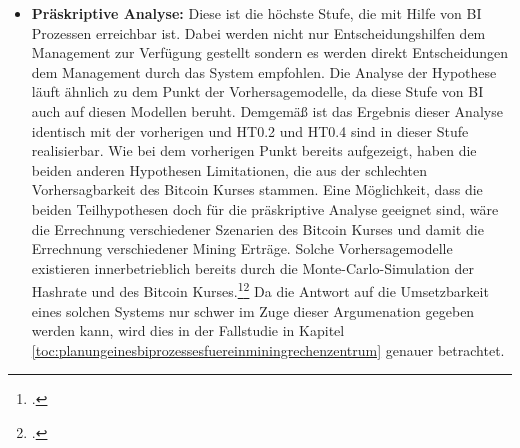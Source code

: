 \begin{itemize}
    Letztendlich kann festgehalten werden, dass der Bitcoin Preis nur bedingt vorhergesagt werden kann, da einige Einflussfaktoren, wie
    beispielsweise Social Media, nicht vorhergesagt werden können und sich mathematischen Möglichkeiten der Analyse weitestgehend entziehen.\footcite[Cf.][]{forbes2021musk}\footcite[Cf.][p. 325]{badertscher2017bitcoin}
    Generell ist dies allerdings kein ausschließliches Problem, das bei Bitcoin auftritt. Bei den klassischen Märkten ist das gleiche
    Problem bemerkbar. Aufgrund der hohen Volatilität des Bitcoin Kurses ist es in diesem Fall jedoch auffälliger.
    Andere \acp{KPI}, wie beispielsweise \ac{OpEx} Kosten oder technische \acp{KPI}, sind im Gegensatz dazu prognostizierbar, da diese
    wenig bis keine Schwankungen unterliegen und somit die Ergebnisse der deskriptiven Analyse unter diesem Paradigma weiterhin
    verwendet werden können. 
    Demnach ist feststellbar, dass \ac{HT0.2} und \ac{HT0.4} für Vorhersagemodelle geeignet sind, da diese ausschließlich \acp{KPI} verwendet,
    die in ausreichender Qualität simuliert werden können. Bei \ac{HT0.1} und \ac{HT0.3} können auch vorhersagende Modelle angewendet werden,
    wobei eine Limitation durch die Vorhersage des Bitcoin Kurses festgestellt werden kann. Dies kann durch eine geeignete Kombination der
    Analysemodelle verbessert werden. Falls es möglich ist, die unstrukturierten und inkonsistenten Daten aus Social Media Plattformen passend zu analysieren,
    sollten diese in die Vorhersagemodellierungen integriert werden. Um einen möglichst guten Eindruck des \ac{BTC} Kurses zu erhalten,
    ist es wichtig mit Echtzeitverarbeitung dieser Daten zu arbeiten.
    \item \textbf{Präskriptive Analyse: }Diese ist die höchste Stufe, die mit Hilfe von \ac{BI} Prozessen erreichbar ist. Dabei werden
    nicht nur Entscheidungshilfen dem Management zur Verfügung gestellt sondern es werden direkt Entscheidungen dem Management durch
    das System empfohlen. Die Analyse der Hypothese läuft ähnlich zu dem Punkt der Vorhersagemodelle, da diese Stufe von \ac{BI} auch
    auf diesen Modellen beruht. Demgemäß ist das Ergebnis dieser Analyse identisch mit der vorherigen und \ac{HT0.2} und \ac{HT0.4} sind in dieser 
    Stufe realisierbar. Wie bei dem vorherigen Punkt bereits aufgezeigt, haben die beiden anderen Hypothesen Limitationen, die aus
    der schlechten Vorhersagbarkeit des Bitcoin Kurses stammen. Eine Möglichkeit, dass die beiden Teilhypothesen doch für die
    präskriptive Analyse geeignet sind, wäre die Errechnung verschiedener Szenarien des Bitcoin Kurses und damit die Errechnung
    verschiedener Mining Erträge. Solche Vorhersagemodelle existieren innerbetrieblich bereits durch die Monte-Carlo-Simulation der Hashrate
    und des Bitcoin Kurses.\footcite[Cf.][]{appendix:mcpreis}\footcite[Cf.][]{appendix:mchashrate}
    Da die Antwort auf die Umsetzbarkeit eines solchen Systems nur schwer im Zuge dieser Argumenation gegeben werden kann, wird
    dies in der Fallstudie in Kapitel \ref{toc:planungeinesbiprozessesfuereinminingrechenzentrum} genauer betrachtet.
\end{itemize}

